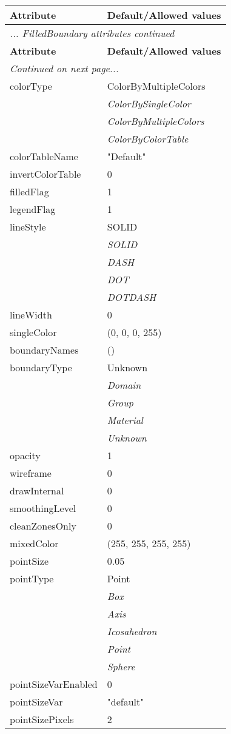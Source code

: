 \documentclass[10pt,a4paper]{report}
\begin{document}
\begin{longtable}{ll}
{\bf Attribute} & {\bf Default/Allowed values} \\
\hline \hline
\endfirsthead
\multicolumn{2}{l}{{\it ... FilledBoundary attributes continued}} \\
{\bf Attribute} & {\bf Default/Allowed values} \\
\hline \hline
\endhead
\hline
\multicolumn{2}{l}{{\it Continued on next page...}} \\
\endfoot
\hline
\endlastfoot

colorType  &  ColorByMultipleColors   \\
 & {\it  ColorBySingleColor} \\
 & {\it  ColorByMultipleColors} \\
 & {\it  ColorByColorTable} \\
colorTableName  &  "Default" \\
invertColorTable  &  0 \\
filledFlag  &  1 \\
legendFlag  &  1 \\
lineStyle  &  SOLID   \\
 & {\it  SOLID} \\
 & {\it  DASH} \\
 & {\it  DOT} \\
 & {\it  DOTDASH} \\
lineWidth  &  0 \\
singleColor  &  (0, 0, 0, 255) \\
boundaryNames  &  () \\
boundaryType  &  Unknown   \\
 & {\it  Domain} \\
 & {\it  Group} \\
 & {\it  Material} \\
 & {\it  Unknown} \\
opacity  &  1 \\
wireframe  &  0 \\
drawInternal  &  0 \\
smoothingLevel  &  0 \\
cleanZonesOnly  &  0 \\
mixedColor  &  (255, 255, 255, 255) \\
pointSize  &  0.05 \\
pointType  &  Point   \\
 & {\it  Box} \\
 & {\it  Axis} \\
 & {\it  Icosahedron} \\
 & {\it  Point} \\
 & {\it  Sphere} \\
pointSizeVarEnabled  &  0 \\
pointSizeVar  &  "default" \\
pointSizePixels  &  2 \\
\end{longtable}
\end{document}
